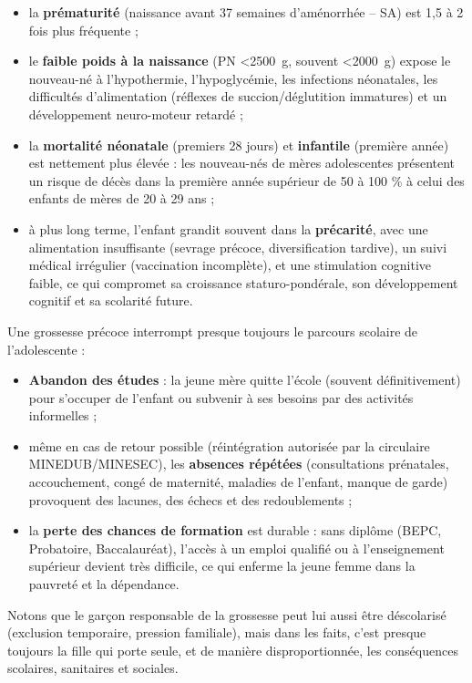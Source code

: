 \documentclass[11pt]{article}
\newcounter{popsec}
\newcounter{popsub}
\newcommand{\courssub}[1]{%
  \stepcounter{popsub}%
  \par\vspace{9pt}\noindent{\popxbold\fontsize{11.5}{13}\selectfont\color{popink}{\color{poporange}\thepopsec.\thepopsub}\hspace{6pt}#1}\par\nopagebreak\vspace{4pt}
}
\begin{document}
\begin{itemize}
\item la \textbf{prématurité} (naissance avant 37 semaines d'aménorrhée -- SA) est 1,5 à 2 fois plus fréquente ;
\item le \textbf{faible poids à la naissance} (PN \textless \SI{2500}{g}, souvent \textless \SI{2000}{g}) expose le nouveau-né à l'hypothermie, l'hypoglycémie, les infections néonatales, les difficultés d'alimentation (réflexes de succion/déglutition immatures) et un développement neuro-moteur retardé ;
\item la \textbf{mortalité néonatale} (premiers 28 jours) et \textbf{infantile} (première année) est nettement plus élevée : les nouveau-nés de mères adolescentes présentent un risque de décès dans la première année supérieur de 50 à 100 \% à celui des enfants de mères de 20 à 29 ans ;
\item à plus long terme, l'enfant grandit souvent dans la \textbf{précarité}, avec une alimentation insuffisante (sevrage précoce, diversification tardive), un suivi médical irrégulier (vaccination incomplète), et une stimulation cognitive faible, ce qui compromet sa croissance staturo-pondérale, son développement cognitif et sa scolarité future.
\end{itemize}

\courssub{Conséquences scolaires}

Une grossesse précoce interrompt presque toujours le parcours scolaire de l'adolescente :

\begin{itemize}
\item \textbf{Abandon des études} : la jeune mère quitte l'école (souvent définitivement) pour s'occuper de l'enfant ou subvenir à ses besoins par des activités informelles ;
\item même en cas de retour possible (réintégration autorisée par la circulaire MINEDUB/MINESEC), les \textbf{absences répétées} (consultations prénatales, accouchement, congé de maternité, maladies de l'enfant, manque de garde) provoquent des lacunes, des échecs et des redoublements ;
\item la \textbf{perte des chances de formation} est durable : sans diplôme (BEPC, Probatoire, Baccalauréat), l'accès à un emploi qualifié ou à l'enseignement supérieur devient très difficile, ce qui enferme la jeune femme dans la pauvreté et la dépendance.
\end{itemize}

Notons que le garçon responsable de la grossesse peut lui aussi être déscolarisé (exclusion temporaire, pression familiale), mais dans les faits, c'est presque toujours la fille qui porte seule, et de manière disproportionnée, les conséquences scolaires, sanitaires et sociales.
\end{document}
